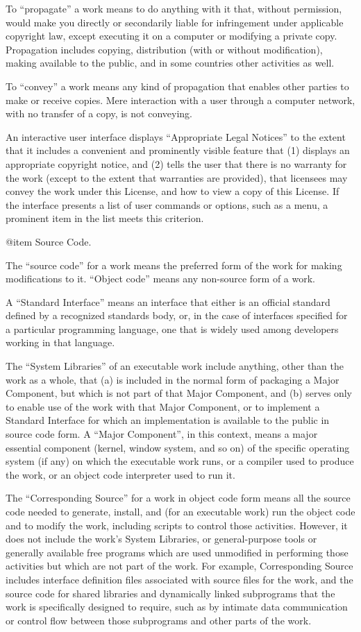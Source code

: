 To ``propagate'' a work means to do anything with it that, without
permission, would make you directly or secondarily liable for
infringement under applicable copyright law, except executing it on a
computer or modifying a private copy.  Propagation includes copying,
distribution (with or without modification), making available to the
public, and in some countries other activities as well.

To ``convey'' a work means any kind of propagation that enables other
parties to make or receive copies.  Mere interaction with a user
through a computer network, with no transfer of a copy, is not
conveying.

An interactive user interface displays ``Appropriate Legal Notices'' to
the extent that it includes a convenient and prominently visible
feature that (1) displays an appropriate copyright notice, and (2)
tells the user that there is no warranty for the work (except to the
extent that warranties are provided), that licensees may convey the
work under this License, and how to view a copy of this License.  If
the interface presents a list of user commands or options, such as a
menu, a prominent item in the list meets this criterion.

@item Source Code.

The ``source code'' for a work means the preferred form of the work for
making modifications to it.  ``Object code'' means any non-source form
of a work.

A ``Standard Interface'' means an interface that either is an official
standard defined by a recognized standards body, or, in the case of
interfaces specified for a particular programming language, one that
is widely used among developers working in that language.

The ``System Libraries'' of an executable work include anything, other
than the work as a whole, that (a) is included in the normal form of
packaging a Major Component, but which is not part of that Major
Component, and (b) serves only to enable use of the work with that
Major Component, or to implement a Standard Interface for which an
implementation is available to the public in source code form.  A
``Major Component'', in this context, means a major essential component
(kernel, window system, and so on) of the specific operating system
(if any) on which the executable work runs, or a compiler used to
produce the work, or an object code interpreter used to run it.

The ``Corresponding Source'' for a work in object code form means all
the source code needed to generate, install, and (for an executable
work) run the object code and to modify the work, including scripts to
control those activities.  However, it does not include the work's
System Libraries, or general-purpose tools or generally available free
programs which are used unmodified in performing those activities but
which are not part of the work.  For example, Corresponding Source
includes interface definition files associated with source files for
the work, and the source code for shared libraries and dynamically
linked subprograms that the work is specifically designed to require,
such as by intimate data communication or control flow between those
subprograms and other parts of the work.

